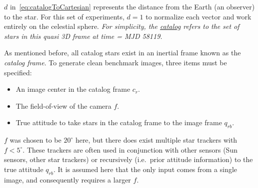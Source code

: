 $d$ in~\autoref{eq:catalogToCartesian} represents the distance from the Earth (an observer) to the star.
For this set of experiments, $d = 1$ to normalize each vector and work entirely on the celestial sphere.
\textit{For simplicity, the \underline{catalog} refers to the set of stars in this quasi 3D frame at time = MJD 58119.}

As mentioned before, all catalog stars exist in an inertial frame known as the \textit{catalog frame}.
To generate clean benchmark images, three items must be specified:
\begin{itemize}
    \item An image center in the catalog frame $c_r$.
    \item The field-of-view of the camera $f$.
    \item True attitude to take stars in the catalog frame to the image frame $q_{rb}$.
\end{itemize}

$f$ was chosen to be $20^\circ$ here, but there does exist multiple star trackers with $f < 5^\circ$.
These trackers are often used in conjunction with other sensors (Sun sensors, other star trackers) or recursively
(i.e.\ prior attitude information) to the true attitude $q_{rb}$.
It is assumed here that the only input comes from a single image, and consequently requires a larger $f$.

\begin{figure}
\end{figure}

